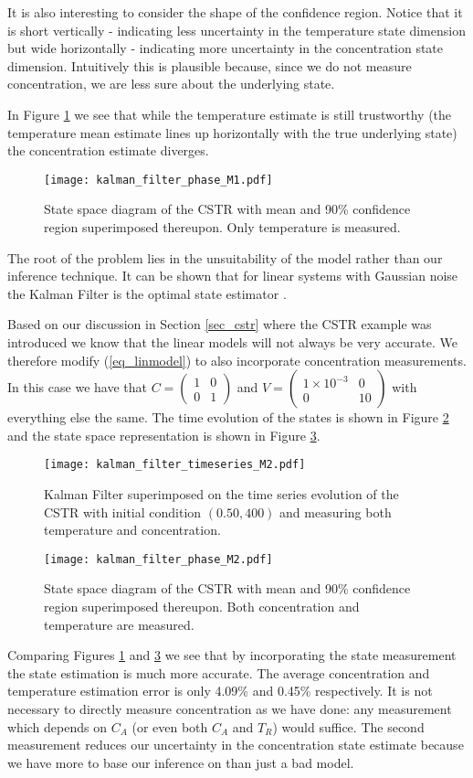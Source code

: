 It is also interesting to consider the shape of the confidence region. Notice that it is short vertically - indicating less uncertainty in the temperature state dimension but wide horizontally - indicating more uncertainty in the concentration state dimension. Intuitively this is plausible because, since we do not measure concentration, we are less sure about the underlying state. 

In Figure \ref{fig_kfphase} we see that while the temperature estimate is still trustworthy (the temperature mean estimate lines up horizontally with the true underlying state) the concentration estimate diverges.
\begin{figure}[H] 
\centering
\texttt{[image: kalman\_filter\_phase\_M1.pdf]}
\caption{State space diagram of the CSTR with mean and 90\% confidence region superimposed thereupon. Only temperature is measured.}
\label{fig_kfphase}
\end{figure}
The root of the problem lies in the unsuitability of the model rather than our inference technique. It can be shown that for linear systems with Gaussian noise the Kalman Filter is the optimal state estimator \cite{shalom}. 

Based on our discussion in Section \ref{sec_cstr} where the CSTR example was introduced we know that the linear models will not always be very accurate. We therefore modify (\ref{eq_linmodel}) to also incorporate concentration measurements. In this case we have that $C = \begin{pmatrix}
1 & 0\\0 &1
\end{pmatrix}$ and $V = \begin{pmatrix}
1\times 10^{-3} & 0\\0 & 10
\end{pmatrix}$ with everything else the same. The time evolution of the states is shown in Figure \ref{fig_kftime2} and the state space representation is shown in Figure \ref{fig_kfphase2}. 
\begin{figure}[H] 
\centering
\texttt{[image: kalman\_filter\_timeseries\_M2.pdf]}
\caption{Kalman Filter superimposed on the time series evolution of the CSTR with initial condition $(0.50, 400)$ and measuring both temperature and concentration.}
\label{fig_kftime2}
\end{figure}
\begin{figure}[H] 
\centering
\texttt{[image: kalman\_filter\_phase\_M2.pdf]}
\caption{State space diagram of the CSTR with mean and 90\% confidence region superimposed thereupon. Both concentration and temperature are measured.}
\label{fig_kfphase2}
\end{figure}
Comparing Figures \ref{fig_kfphase} and \ref{fig_kfphase2} we see that by incorporating the state measurement the state estimation is much more accurate. The average concentration and temperature estimation error is only 4.09\% and 0.45\% respectively. It is not necessary to directly measure concentration as we have done: any measurement which depends on $C_A$ (or even both $C_A$ and $T_R$) would suffice. The second measurement reduces our uncertainty in the concentration state estimate because we have more to base our inference on than just a bad model.  
